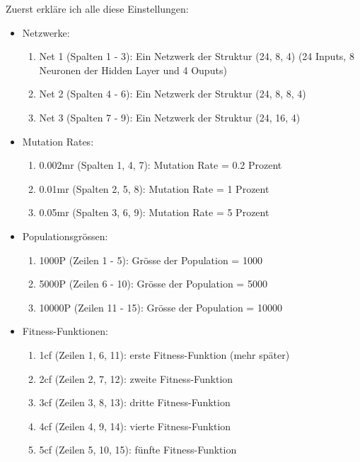 \documentclass[11pt,a4paper,ngerman]{article}
\begin{document}
Zuerst erkläre ich alle diese Einstellungen:
\begin{itemize}  
    \item Netzwerke: 
    \begin{enumerate}
        \item Net 1 (Spalten 1 - 3): Ein Netzwerk der Struktur (24, 8, 4) (24 Inputs, 8 Neuronen der Hidden Layer und 4 Ouputs)
        \item Net 2 (Spalten 4 - 6): Ein Netzwerk der Struktur (24, 8, 8, 4)
        \item Net 3 (Spalten 7 - 9): Ein Netzwerk der Struktur (24, 16, 4)
        
    \end{enumerate}
    \item Mutation Rates:
    \begin{enumerate}
        \item 0.002mr (Spalten 1, 4, 7): Mutation Rate = 0.2 Prozent
        \item 0.01mr (Spalten 2, 5, 8): Mutation Rate = 1 Prozent
        \item 0.05mr (Spalten 3, 6, 9): Mutation Rate = 5 Prozent 
    \end{enumerate}
    \item Populationsgrössen:
    \begin{enumerate}
        \item 1000P (Zeilen 1 - 5): Grösse der Population = 1000
        \item 5000P (Zeilen 6 - 10): Grösse der Population = 5000
        \item 10000P (Zeilen 11 - 15): Grösse der Population = 10000
    \end{enumerate}
    \item Fitness-Funktionen:
    \begin{enumerate}       
        \item 1cf (Zeilen 1, 6, 11): erste Fitness-Funktion (mehr später)
        \item 2cf (Zeilen 2, 7, 12): zweite Fitness-Funktion 
        \item 3cf (Zeilen 3, 8, 13): dritte Fitness-Funktion
        \item 4cf (Zeilen 4, 9, 14): vierte Fitness-Funktion
        \item 5cf (Zeilen 5, 10, 15): fünfte Fitness-Funktion
    \end{enumerate}
\end{itemize}
\end{document}
